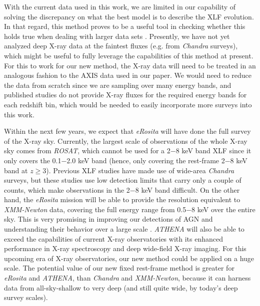 \documentclass[fleqn,usenatbib]{mnras}
\begin{document}
    With the current data used in this work, we are limited in our capability of solving the discrepancy on what the best model is to describe the XLF evolution.
    In that regard, this method proves to be a useful tool in checking whether this holds true when dealing with larger data sets \citep[e.g.][who include almost 3000 AGN sources in the hard band]{aird2015evolution}.
    Presently, we have not yet analyzed deep X-ray data at the faintest fluxes (e.g. from \textit{Chandra} surveys), which might be useful to fully leverage the capabilities of this method at present.
    For this to work for our new method, the X-ray data will need to be treated in an analogous fashion to the AXIS data used in our paper.
    We would need to reduce the data from scratch since we are sampling over many energy bands, and published studies do not provide X-ray fluxes for the required energy bands for each redshift bin, which would be needed to easily incorporate more surveys into this work.
    
    Within the next few years, we expect that \textit{eRosita} will have done the full survey of the X-ray sky. 
    Currently, the largest scale of observations of the whole X-ray sky comes from \textit{ROSAT}, which cannot be used for a 2$-$8 keV band XLF since it only covers the 0.1$-$2.0 keV band (hence, only covering the rest-frame 2$-$8 keV band at $z \geq 3$).
    Previous XLF studies have made use of wide-area \textit{Chandra} surveys, but these studies use low detection limits that carry only a couple of counts, which make observations in the 2$-$8 keV band difficult.
    On the other hand, the \textit{eRosita} mission will be able to provide the resolution equivalent to \textit{XMM-Newton} data, covering the full energy range from 0.5$-$8 keV over the entire sky.
    This is very promising in improving our detections of AGN and understanding their behavior over a large scale \citep{kolodzig2013erosita}.
    \textit{ATHENA} will also be able to exceed the capabilities of current X-ray observatories with its enhanced performance in X-ray spectroscopy and deep wide-field X-ray imaging.
    For this upcoming era of X-ray observatories, our new method could be applied on a huge scale.
    The potential value of our new fixed rest-frame method is greater for \textit{eRosita} and \textit{ATHENA}, than \textit{Chandra} and \textit{XMM-Newton}, because it can harness data from all-sky-shallow to very deep (and still quite wide, by today's deep survey scales).
\end{document}
